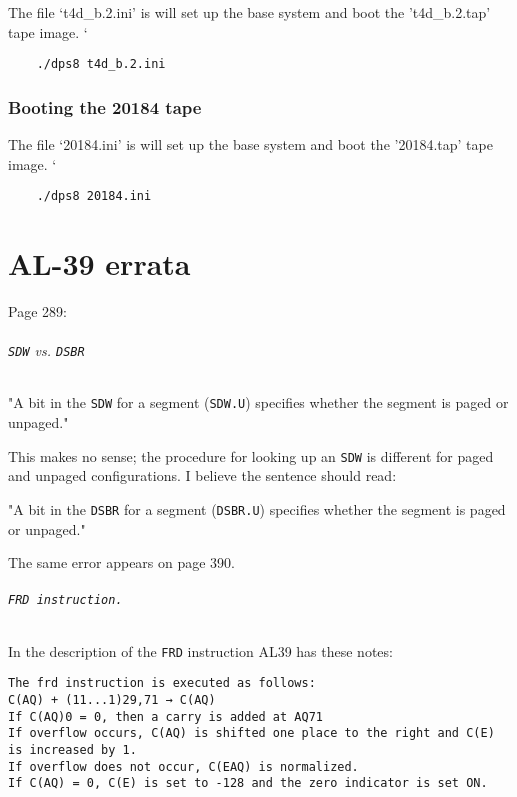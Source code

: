 \documentclass[notitlepage]{report}
\begin{document}
The file `t4d\_b.2.ini' is will set up the base system and boot the 't4d\_b.2.tap' tape image.
`
\begin{lstlisting}
	./dps8 t4d_b.2.ini
\end{lstlisting}

\section{Booting the 20184 tape}

The file `20184.ini' is will set up the base system and boot the '20184.tap' tape image.
`
\begin{lstlisting}
	./dps8 20184.ini
\end{lstlisting}

\part{AL-39 errata}

Page 289: 

\paragraph{\texttt{SDW} vs. \texttt{DSBR}}

"A bit in the \texttt{SDW} for a segment (\texttt{SDW.U}) specifies whether the segment is paged or
unpaged."

This makes no sense; the procedure for looking up an \texttt{SDW} is different for paged and unpaged
configurations. I believe the sentence should read:

"A bit in the \texttt{DSBR} for a segment (\texttt{DSBR.U}) specifies whether the segment is paged or
unpaged."

The same error appears on page 390.

\paragraph{\texttt{FRD instruction.}}

In the description of the \texttt{FRD} instruction AL39 has these notes:

\begin{verbatim}
The frd instruction is executed as follows:
C(AQ) + (11...1)29,71 → C(AQ)
If C(AQ)0 = 0, then a carry is added at AQ71
If overflow occurs, C(AQ) is shifted one place to the right and C(E) is increased by 1.
If overflow does not occur, C(EAQ) is normalized.
If C(AQ) = 0, C(E) is set to -128 and the zero indicator is set ON.
\end{verbatim}
\end{document}
